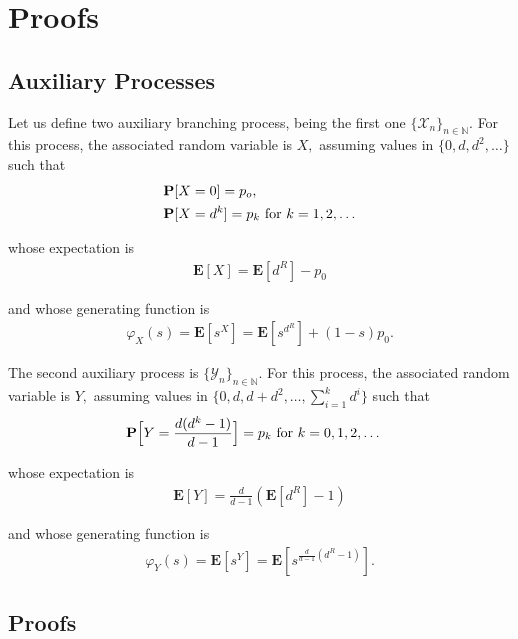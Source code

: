 \documentclass[12pt,reqno,oneside]{amsart}
\theoremstyle{plain}
\theoremstyle{definition}
\numberwithin{equation}{section}
\begin{document}
\section{Proofs}
\label{S: proofs}

\subsection{Auxiliary Processes}
\label{SS: AP}

Let us define two auxiliary branching process, being the first one 
$\{\mathcal{X}_n\}_{n \in {{\mathbb N}}}$. For this process, the associated random
variable is  $ X,$ assuming values in $\{0, d, d^2, \dots \} $ 
such that 
\begin{align*}
&{{\mathbf P}}[X=0] = p_o, \\
&{{\mathbf P}}[X=d^k] = p_k \hbox{ for } k =1,2, \dots
\end{align*}

\noindent
whose expectation is 
\begin{align}
\label{E: Minorante}
{{\mathbf E}}[X] = {{\mathbf E}}[d^R]-p_0
\end{align}

\noindent
and whose generating function is
\begin{align}
\label{E: GFMinorante}
\varphi_{X}(s) = {{\mathbf E}}[s^X] = {{\mathbf E}}[s^{d^R}] + (1-s)p_0.
\end{align}

The second auxiliary process is $\{\mathcal{Y}_n\}_{n \in {{\mathbb N}}}$. 
For this process, the associated random
variable is  $ Y,$ assuming values in $\{0, d, d + d^2, \dots, \sum_{i=1}^k d^i \} $ 
such that 
\begin{align*}
&{{\mathbf P}}\Big[Y = \frac{d(d^k-1)}{d-1}\Big] = p_k \hbox{ for } k = 0,1,2, \dots
\end{align*}

\noindent
whose expectation is 
\begin{align}
\label{E: Majorante}
{{\mathbf E}}[Y] = \frac{d}{d-1}({{\mathbf E}}[d^R]-1)
\end{align}

\noindent
and whose generating function is
\begin{align}
\label{E: GFMajorante}
\varphi_{Y}(s) = {{\mathbf E}}[s^Y] = {{\mathbf E}}[s^{\frac{d}{d-1}(d^{R}-1)}].
\end{align}

\subsection{Proofs}
\label{SS: Proofs}
\hfill
\end{document}
